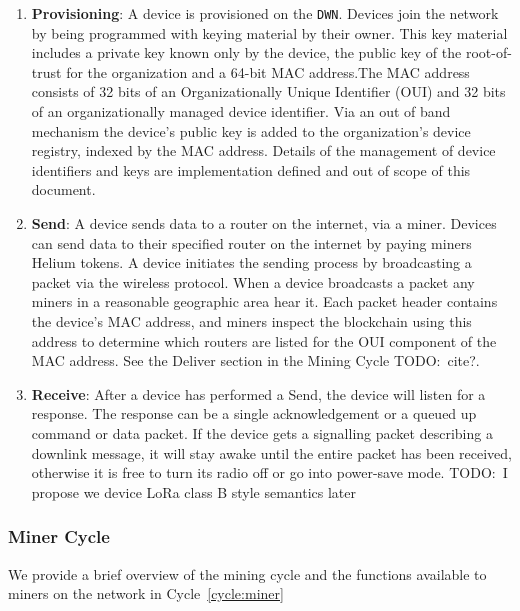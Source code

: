 \documentclass[letterpaper,11pt]{article}
\newcommand{\todo}[1]{}
\renewcommand{\todo}[1]{{\color{red} TODO:\ {#1}}}
\begin{document}
\begin{enumerate}
  \item \textbf{Provisioning}: A device is provisioned on the \verb|DWN|.
   Devices join the network by being programmed with keying material by their owner. This key material includes a private key known only by the device, the public key of the root-of-trust for the organization and a 64-bit MAC address.The MAC address consists of 32 bits of an Organizationally Unique Identifier (OUI) and 32 bits of an organizationally managed device identifier. Via an out of band mechanism the device's public key is added to the organization's device registry, indexed by the MAC address. Details of the management of device identifiers and keys are implementation defined and out of scope of this document.

  \item \textbf{Send}: A device sends data to a router on the internet, via a miner.
  Devices can send data to their specified router on the internet by paying miners Helium tokens.
        A device initiates the sending process by broadcasting a packet via the wireless protocol. When a device broadcasts a packet any miners in a reasonable geographic area hear it. Each packet header contains the device's MAC address, and miners inspect the blockchain using this address to determine which routers are listed for the OUI component of the MAC address. See the Deliver section in the Mining Cycle \todo{cite?}.

    \item \textbf{Receive}: After a device has performed a Send, the device will listen for a response. The response can be a single acknowledgement or a queued up command or data packet. If the device gets a signalling packet describing a downlink message, it will stay awake until the entire packet has been received, otherwise it is free to turn its radio off or go into power-save mode. \todo{I propose we device LoRa class B style semantics later}

\end{enumerate}

\subsubsection{Miner Cycle}\label{mining}

We provide a brief overview of the mining cycle and the functions available to miners on the network in Cycle~\ref{cycle:miner}
\end{document}
